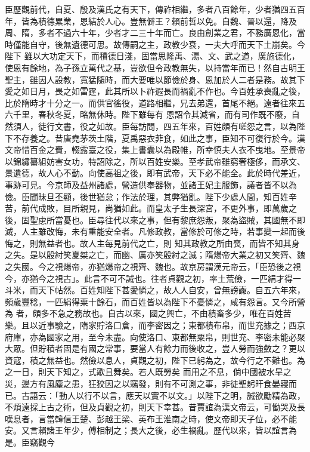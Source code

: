 \begin{pinyinscope}
 臣歷觀前代，自夏、殷及漢氏之有天下，傳祚相繼，多者八百餘年，少者猶四五百年，皆為積德累業，恩結於人心。豈無僻王？賴前哲以免。自魏、晉以還，降及周、隋，多者不過六十年，少者才二三十年而亡。良由創業之君，不務廣恩化，當時僅能自守，後無遺德可思。故傳嗣之主，政教少衰，一夫大呼而天下土崩矣。今陛下
 雖以大功定天下，而積德日淺，固當思隆禹、湯、文、武之道，廣施德化，使恩有餘地，為子孫立萬代之基，豈欲但令政教無失，以持當年而已！然自古明王聖主，雖因人設教，寬猛隨時，而大要唯以節儉於身、恩加於人二者是務。故其下愛之如日月，畏之如雷霆，此其所以卜祚遐長而禍亂不作也。今百姓承喪亂之後，比於隋時才十分之一。而供官徭役，道路相繼，兄去弟還，首尾不絕。遠者往來五六千里，春秋冬夏，略無休時。陛下雖每有
 恩詔令其減省，而有司作既不廢，自然須人，徒行文書，役之如故。臣每訪問，四五年來，百姓頗有嗟怨之言，以為陛下不存養之。昔唐堯茅茨土階，夏禹惡衣菲食，如此之事，臣知不可復行於今。漢文帝惜百金之費，輟露臺之役，集上書囊以為殿帷，所幸慎夫人衣不曳地。至景帝以錦繡纂組妨害女功，特詔除之，所以百姓安樂。至孝武帝雖窮奢極侈，而承文、景遺德，故人心不動。向使高祖之後，即有武帝，天下必不能全。此於時代差近，
 事跡可見。今京師及益州諸處，營造供奉器物，並諸王妃主服飾，議者皆不以為儉。臣聞昧旦丕顯，後世猶怠；作法於理，其弊猶亂。陛下少處人間，知百姓辛苦，前代成敗，目所親見，尚猶如此。而皇太子生長深宮，不更外事，即萬歲之後，固聖慮所當憂也。臣尋往代以來之事，但有黎庶怨叛，聚為盜賊，其國無不即滅，人主雖改悔，未有重能安全者。凡修政教，當修於可修之時，若事變一起而後悔之，則無益者也。故人主每見前代之亡，則
 知其政教之所由喪，而皆不知其身之失。是以殷紂笑夏桀之亡，而幽、厲亦笑殷紂之滅；隋煬帝大業之初又笑齊、魏之失國。今之視煬帝，亦猶煬帝之視齊、魏也。故京房謂漢元帝云，「臣恐後之視今，亦猶今之視古」。此言不可不誡也。往者貞觀之初，率土荒儉，一匹絹才得一斗米，而天下帖然。百姓知陛下甚愛憐之，故人人自安，曾無謗讟。自五六年來，頻歲豐稔，一匹絹得粟十餘石，而百姓皆以為陛下不憂憐之，咸有怨言。又今所營為
 者，頗多不急之務故也。自古以來，國之興亡，不由積畜多少，唯在百姓苦樂。且以近事驗之，隋家貯洛口倉，而李密因之；東都積布帛，而世充據之；西京府庫，亦為國家之用，至今未盡。向使洛口、東都無粟帛，則世充、李密未能必聚大眾。但貯積者固是有國之常事，要當人有餘力而後收之，豈人勞而強斂之？更以資寇，積之無益也。然儉以息人，貞觀之初，陛下已躬為之，故今行之不難也。為之一日，則天下知之，式歌且舞矣。若人既勞矣
 而用之不息，倘中國被水旱之災，邊方有風塵之患，狂狡因之以竊發，則有不可測之事，非徒聖躬旰食晏寢而已。古語云：「動人以行不以言，應天以實不以文。」以陛下之明，誠欲勵精為政，不煩遠採上古之術，但及貞觀之初，則天下幸甚。昔賈誼為漢文帝云，可慟哭及長嘆息者，言當韓信王楚、彭越王梁、英布王淮南之時，使文帝即天子位，必不能安。又言賴諸王年少，傅相制之；長大之後，必生禍亂。歷代以來，皆以誼言為是。臣竊觀今

\end{pinyinscope}
